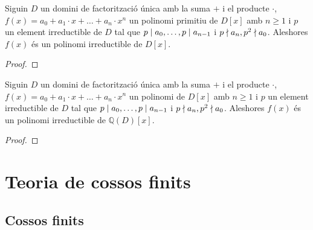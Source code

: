 \documentclass[../Apunts.tex]{subfiles}
\begin{document}
	\begin{theorem}
		\label{thm:Criteri d'Eisenstein}
		Siguin \(D\) un domini de factorització única amb la suma \(+\) i el producte \(\cdot\), \(f(x)=a_{0}+a_{1}\cdot x+\dots+a_{n}\cdot x^{n}\) un polinomi primitiu de \(D[x]\) amb \(n\geq1\) i \(p\) un element irreductible de \(D\) tal que \(p\mathrel{|} a_{0},\dots,p\mathrel{|} a_{n-1}\) i \(p\mathrel{\nmid} a_{n},p^{2}\mathrel{\nmid} a_{0}\). Aleshores \(f(x)\) és un polinomi irreductible de \(D[x]\).
		\begin{proof}
		\end{proof}
	\end{theorem}
	\begin{corollary}
		Siguin \(D\) un domini de factorització única amb la suma \(+\) i el producte \(\cdot\), \(f(x)=a_{0}+a_{1}\cdot x+\dots+a_{n}\cdot x^{n}\) un polinomi de \(D[x]\) amb \(n\geq1\) i \(p\) un element irreductible de \(D\) tal que \(p\mathrel{|} a_{0},\dots,p\mathrel{|} a_{n-1}\) i \(p\mathrel{\nmid} a_{n},p^{2}\mathrel{\nmid} a_{0}\). Aleshores \(f(x)\) és un polinomi irreductible de \(\mathbb{Q}(D)[x]\).
		\begin{proof}
		\end{proof}
	\end{corollary}
	\chapter{Teoria de cossos finits}
	\section{Cossos finits}
\end{document}
